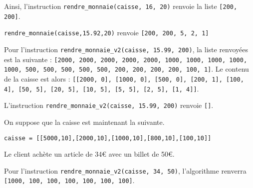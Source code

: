 
Ainsi, l'instruction \texttt{rendre\_monnaie(caisse, 16, 20)} renvoie la liste \texttt{[200, 200]}. 

\texttt{rendre\_monnaie(caisse,15.92,20)} renvoie \texttt{[200, 200, 5, 2, 1]}



Pour l'instruction \texttt{rendre\_monnaie\_v2(caisse, 15.99, 200)}, la liste renvoyées est la suivante :
\texttt{[2000, 2000, 2000, 2000, 2000, 1000, 1000, 1000, 1000, 1000, 500, 500, 500, 500, 500, 200, 200, 200, 200, 100, 1]}. Le contenu de la caisse est alors : \texttt{[[2000, 0], [1000, 0], [500, 0], [200, 1], [100, 4], [50, 5], [20, 5], [10, 5], [5, 5], [2, 5], [1, 4]]}.

L'instruction \texttt{rendre\_monnaie\_v2(caisse, 15.99, 200)} renvoie \texttt{[]}.

On suppose que la caisse est maintenant la suivante. 
\begin{lstlisting}
caisse = [[5000,10],[2000,10],[1000,10],[800,10],[100,10]]
\end{lstlisting}

Le client achète un article de 34\euro{} avec un billet de 50\euro{}.


Pour l'instruction \texttt{rendre\_monnaie\_v2(caisse, 34, 50)}, l'algorithme renverra \texttt{[1000, 100, 100, 100, 100, 100, 100]}.

